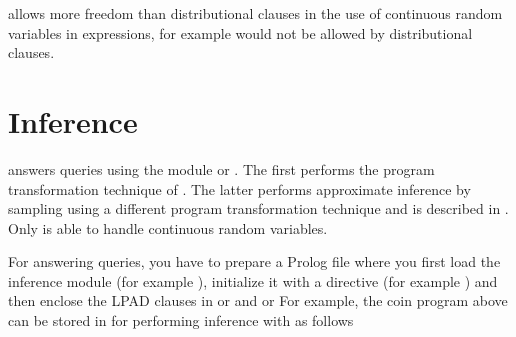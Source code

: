 \documentclass[letterpaper,10pt,english]{sphinxmanual}
\begin{document}
 allows more freedom than distributional clauses in the use of continuous random variables in expressions,
for example  would not be allowed by distributional clauses.


\chapter{Inference}
\label{\detokenize{index:inference}}
 answers queries using the module  or .
The first performs the program transformation technique of .
The latter performs approximate inference by sampling using a different program transformation technique and is described in .
Only  is able to handle continuous random variables.

For answering queries, you have to prepare a Prolog file where you first load the inference module (for example ), initialize it with a directive (for example ) and then enclose the LPAD clauses in  or  and  or 
For example, the coin program above can be stored in  for performing inference with  as follows

\begin{sphinxVerbatim}[commandchars=\\\{\}]
 
 
 
  
\PYGZbs{}

  

  

 
\end{sphinxVerbatim}
\end{document}
